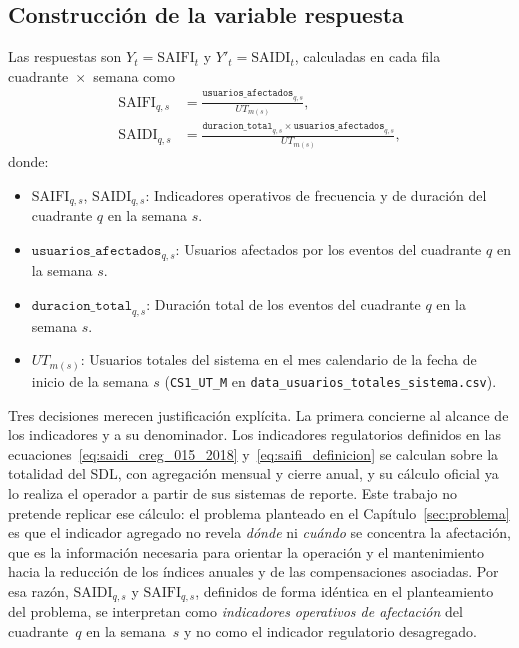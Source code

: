 \subsection{Construcción de la variable respuesta}
\label{sec:construccion_respuesta}
Las respuestas son $Y_t=\mathrm{SAIFI}_t$ y $Y'_t=\mathrm{SAIDI}_t$, calculadas en cada fila cuadrante~$\times$~semana como
\begin{equation}
    \begin{aligned}
    \mathrm{SAIFI}_{q,s} &= \frac{\texttt{usuarios\_afectados}_{q,s}}{UT_{m(s)}}, \\[4pt]
    \mathrm{SAIDI}_{q,s} &= \frac{\texttt{duracion\_total}_{q,s} \times \texttt{usuarios\_afectados}_{q,s}}{UT_{m(s)}},
    \end{aligned}
    \label{eq:respuestas_saidi_saifi}
\end{equation}
donde:
\begin{itemize}
    \item $\mathrm{SAIFI}_{q,s}$, $\mathrm{SAIDI}_{q,s}$: Indicadores operativos de frecuencia y de duración del cuadrante $q$ en la semana $s$.
    \item $\texttt{usuarios\_afectados}_{q,s}$: Usuarios afectados por los eventos del cuadrante $q$ en la semana $s$.
    \item $\texttt{duracion\_total}_{q,s}$: Duración total de los eventos del cuadrante $q$ en la semana $s$.
    \item $UT_{m(s)}$: Usuarios totales del sistema en el mes calendario de la fecha de inicio de la semana $s$ (\texttt{CS1\_UT\_M} en \texttt{data\_usuarios\_totales\_sistema.csv}).
\end{itemize}

Tres decisiones merecen justificación explícita. La primera concierne al alcance de los indicadores y a su denominador. Los indicadores regulatorios definidos en las ecuaciones~\eqref{eq:saidi_creg_015_2018} y~\eqref{eq:saifi_definicion} se calculan sobre la totalidad del SDL, con agregación mensual y cierre anual, y su cálculo oficial ya lo realiza el operador a partir de sus sistemas de reporte. Este trabajo no pretende replicar ese cálculo: el problema planteado en el Capítulo~\ref{sec:problema} es que el indicador agregado no revela \textit{dónde} ni \textit{cuándo} se concentra la afectación, que es la información necesaria para orientar la operación y el mantenimiento hacia la reducción de los índices anuales y de las compensaciones asociadas. Por esa razón, $\mathrm{SAIDI}_{q,s}$ y $\mathrm{SAIFI}_{q,s}$, definidos de forma idéntica en el planteamiento del problema, se interpretan como \textit{indicadores operativos de afectación} del cuadrante~$q$ en la semana~$s$ y no como el indicador regulatorio desagregado.

